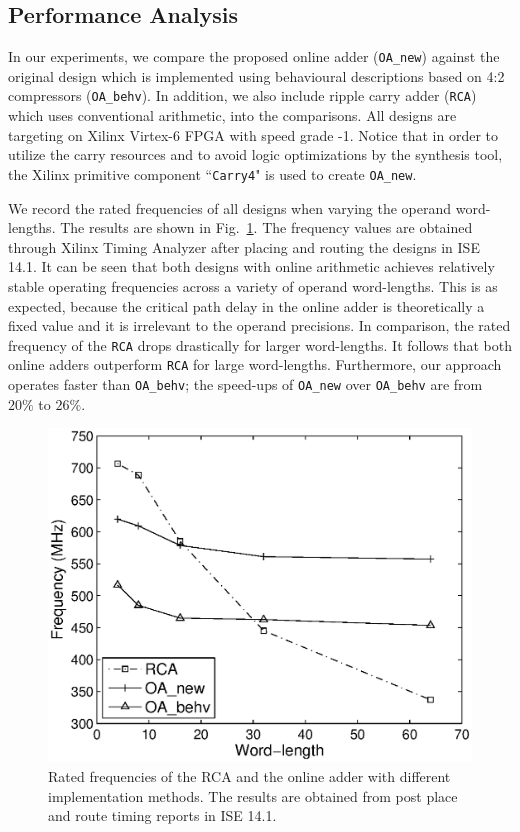 \documentclass[conference]{IEEEtran}
\begin{document}
\subsection{Performance Analysis}\label{subsec:OA_Performance}
In our experiments, we compare the proposed online adder (\texttt{OA\_new}) against the original design which is implemented using behavioural descriptions based on 4:2 compressors (\texttt{OA\_behv}).  In addition, we also include ripple carry adder (\texttt{RCA}) which uses conventional arithmetic, into the comparisons. All designs are targeting on Xilinx Virtex-6 FPGA with speed grade -1. Notice that in order to utilize the carry resources and to avoid logic optimizations by the synthesis tool, the Xilinx primitive component ``\texttt{Carry4}" is used to create \texttt{OA\_new}.


We record the rated frequencies of all designs when varying the operand word-lengths. The results are shown in Fig.~\ref{Fig:AdderFreq}. The frequency values are obtained through Xilinx Timing Analyzer after placing and routing the designs in ISE 14.1. It can be seen that both designs with online arithmetic achieves relatively stable operating frequencies across a variety of operand word-lengths. This is as expected, because the critical path delay in the online adder is theoretically a fixed value and it is irrelevant to the operand precisions. In comparison, the rated frequency of the \texttt{RCA} drops drastically for larger word-lengths. It follows that both online adders outperform \texttt{RCA} for large word-lengths. Furthermore, our approach operates faster than \texttt{OA\_behv}; the speed-ups of \texttt{OA\_new} over \texttt{OA\_behv} are from $20\%$ to $26\%$.

\begin{figure}[tbp]
	\centering
	\includegraphics[width=.45\textwidth]{./Figures/Exp/Adder_Freq.eps}
	\caption{Rated frequencies of the RCA and the online adder with different implementation methods. The results are obtained from post place and route timing reports in ISE 14.1.}
	\label{Fig:AdderFreq}
	\vspace{-1ex}
\end{figure}
\end{document}
